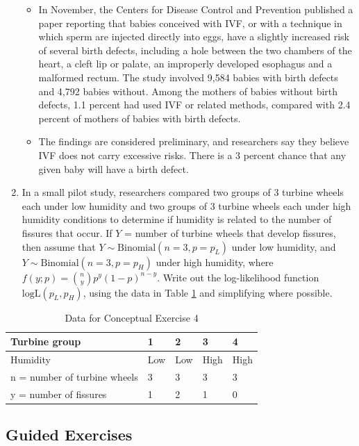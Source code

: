 \documentclass[
]{krantz}
\begin{document}
\begin{enumerate}
  \begin{itemize}
  \item
    In November, the Centers for Disease Control and Prevention published a paper reporting that babies conceived with IVF, or with a technique in which sperm are injected directly into eggs, have a slightly increased risk of several birth defects, including a hole between the two chambers of the heart, a cleft lip or palate, an improperly developed esophagus and a malformed rectum. The study involved 9,584 babies with birth defects and 4,792 babies without. Among the mothers of babies without birth defects, 1.1 percent had used IVF or related methods, compared with 2.4 percent of mothers of babies with birth defects.
  \item
    The findings are considered preliminary, and researchers say they believe IVF does not carry excessive risks. There is a 3 percent chance that any given baby will have a birth defect.
  \end{itemize}
\item
  In a small pilot study, researchers compared two groups of 3 turbine wheels each under low humidity and two groups of 3 turbine wheels each under high humidity conditions to determine if humidity is related to the number of fissures that occur. If \(Y\) = number of turbine wheels that develop fissures, then assume that \(Y \sim \textrm{Binomial}(n=3, p=p_L)\) under low humidity, and \(Y \sim \textrm{Binomial}(n=3, p=p_H)\) under high humidity, where \(f(y;p)=\binom{n}{y} p^y (1-p)^{n-y}\). Write out the log-likelihood function \(\textrm{logL}(p_L, p_H)\), using the data in Table \ref{tab:fissurechp6} and simplifying where possible.
\end{enumerate}

\begin{table}

\caption{\label{tab:fissurechp6}Data for Conceptual Exercise 4}
\centering
\begin{tabular}[t]{>{\raggedright\arraybackslash}p{5cm}llll}
\toprule
Turbine group & 1 & 2 & 3 & 4\\
\midrule
Humidity & Low & Low & High & High\\
n = number of turbine wheels & 3 & 3 & 3 & 3\\
y = number of fissures & 1 & 2 & 1 & 0\\
\bottomrule
\end{tabular}
\end{table}

\hypertarget{guided-exercises-4}{%
\subsection{Guided Exercises}\label{guided-exercises-4}}
\end{document}
